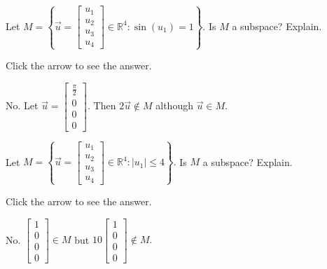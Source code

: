 \documentclass{ximera}
\begin{document}
\begin{problem}\label{prb:5.9} Let $M=\left\{ \vec{u}=\left[
\begin{array}{c}
u_{1} \\
u_{2} \\
u_{3} \\
u_{4}
\end{array}
\right] \in
\mathbb{R}^{4}:\sin \left( u_{1}\right) =1\right\} .$ Is $M$ a subspace?
Explain.

Click the arrow to see the answer.  
\begin{expandable}
No. Let $\vec{u}=\left[ \begin{array}{r}
\frac{\pi }{2} \\
0 \\
0 \\
0
\end{array}
\right] .$ Then $2\vec{u}\notin M$ although $\vec{u}\in M$.
\end{expandable}
\end{problem}

\begin{problem}\label{prb:5.10} Let $M=\left\{ \vec{u}=\left[ \begin{array}{c}
u_{1} \\
u_{2} \\
u_{3} \\
u_{4}
\end{array}\right] \in
\mathbb{R}^{4}:|u_{1}| \leq 4\right\} .$ Is $M$ a
subspace? Explain.

Click the arrow to see the answer.  
\begin{expandable}
No. $\left[
\begin{array}{r}
1 \\
0 \\
0 \\
0
\end{array}
\right] \in M$ but $10\left[ \begin{array}{r}
1 \\
0 \\
0 \\
0
\end{array}
\right] \notin M.$
\end{expandable}
\end{problem}
\end{document}
